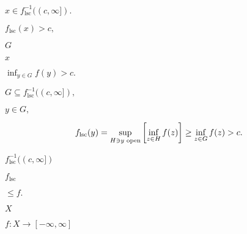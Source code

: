 \documentclass[10pt]{book}
\begin{document}
\begin{mdSnippets}
\begin{mdInlineSnippet}[dda33429d47a479bd58c90c028c6a8dc]
$x \in f_\text{lsc}^{-1}((c, \infty]).$\end{mdInlineSnippet}%
\begin{mdInlineSnippet}%
$f_\text{lsc}(x) > c,$\end{mdInlineSnippet}%
\begin{mdInlineSnippet}[dfcf28d0734569a6a693bc8194de62bf]%
$G$\end{mdInlineSnippet}%
\begin{mdInlineSnippet}[9dd4e461268c8034f5c8564e155c67a6]%
$x$\end{mdInlineSnippet}%
\begin{mdInlineSnippet}[fa6df5e05607277312d1916fbcb7e7f6]%
$\inf_{y \in G} f(y) > c.$\end{mdInlineSnippet}%
\begin{mdInlineSnippet}%
$G \subseteq f_\text{lsc}^{-1}((c, \infty]),$\end{mdInlineSnippet}%
\begin{mdInlineSnippet}[714cc660bd6eeb3c898a5b3a78bb1400]%
$y \in G,$\end{mdInlineSnippet}%
\begin{mdDisplaySnippet}%
\[%
f_\text{lsc}(y) = \sup_{H \ni y \text{ open}} \qty[\inf_{z \in H} f(z)]
\ge \inf_{z \in G} f(z) > c.
\]%
\end{mdDisplaySnippet}%
\begin{mdInlineSnippet}[9a7859563ae8bcfe2b67b09eb067e6f0]%
$f_\text{lsc}^{-1}((c, \infty])$\end{mdInlineSnippet}%
\begin{mdInlineSnippet}[4a08201c96014391857403079b385a9d]%
$f_\text{lsc}$\end{mdInlineSnippet}%
\begin{mdInlineSnippet}[c989cffc67c9db2447b6734833c54363]%
$\le f.$\end{mdInlineSnippet}%
\begin{mdInlineSnippet}[02129bb861061d1a052c592e2dc6b383]%
$X$\end{mdInlineSnippet}%
\begin{mdInlineSnippet}[9c3729f1b2ef77b97bbdb1135d803c69]%
$f: X \to [-\infty, \infty]$\end{mdInlineSnippet}%

\end{mdSnippets}
\end{document}
